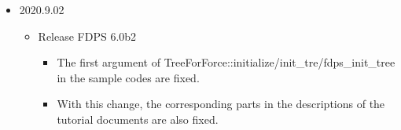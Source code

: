\begin{itemize}
  \item 2020.9.02
    \begin{itemize}
    \item Release FDPS 6.0b2
       \begin{itemize}
          \item The first argument of TreeForForce::initialize/init\_tre/fdps\_init\_tree in the sample codes are fixed.
          \item With this change, the corresponding parts in the descriptions of the tutorial documents are also fixed.
       \end{itemize}
    \end{itemize}



\end{itemize}
